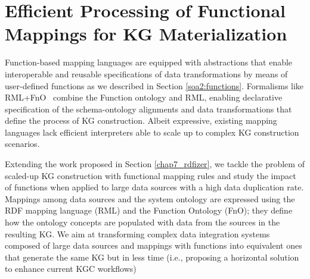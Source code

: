
\section{Efficient Processing of Functional Mappings for KG Materialization}
\label{chap7_funmap}
Function-based mapping languages \citep{de2017declarative,debruyne2016r2rml,junior2016funul,vu2019d} are equipped with abstractions that enable interoperable and reusable specifications of data transformations by means of user-defined functions as we described in Section \ref{soa2:functions}. Formalisms like RML+FnO~\citep{de2017declarative} combine the Function ontology and RML, enabling declarative specification of the schema-ontology alignments and data transformations that define the process of KG construction. Albeit expressive, existing mapping languages lack efficient interpreters able to scale up to complex KG construction scenarios. 

Extending the work proposed in Section \ref{chap7_rdfizer}, we tackle the problem of scaled-up KG construction with functional mapping rules and study the impact of functions when applied to large data sources with a high data duplication rate. Mappings among data sources and the system ontology are expressed using the RDF mapping language (RML) \citep{de2017declarative} and the Function Ontology (FnO); they define how the ontology concepts are populated with data from the sources in the resulting KG. We aim at transforming complex data integration systems composed of large data sources and mappings with functions into equivalent ones that generate the same KG but in less time (i.e., proposing a horizontal solution to enhance current KGC workflows)

